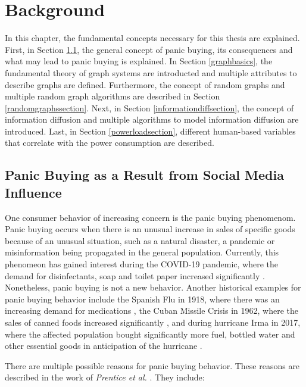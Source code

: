 \chapter{Background}
\label{background}

In this chapter, the fundamental concepts necessary for this thesis are explained.
First, in Section \ref{panicbuying}, the general concept of panic buying,
its consequences and what may lead to panic buying is explained.
In Section \ref{graphbasics}, the fundamental theory of graph systems are 
introducted and multiple attributes to describe graphs are defined.
Furthermore, the concept of random graphs and multiple random 
graph algorithms are described in Section \ref{randomgraphssection}.
Next, in Section \ref{informationdiffsection}, the concept of information diffusion
and multiple algorithms to model information diffusion are introduced.
Last, in Section \ref{powerloadsection}, different human-based variables that 
correlate with the power consumption are described.


\section{Panic Buying as a Result from Social Media Influence}
\label{panicbuying}

One consumer behavior of increasing concern is the panic buying phenomenom.
Panic buying occurs when there is an unusual increase in sales of specific
goods because of an unusual situation, such as a natural disaster, a 
pandemic or misinformation being propagated in the general population. 
Currently, this phenomeon has gained interest during the COVID-19 pandemic,
where the demand for disinfectants, soap and toilet paper increased significantly
\cite{covidpanicbuying}. Nonetheless, panic buying is not a new behavior.
Another historical examples for panic buying behavior include the Spanish Flu
in 1918, where there was an increasing demand for medications 
\cite{honigsbaum2013regulating}, the Cuban Missile Crisis in 1962, where the sales
of canned foods increased significantly \cite{george2004awaiting}, 
and during hurricane Irma in 2017, where the affected population bought
significantly more fuel, bottled water 
and other essential goods in anticipation of the hurricane \cite{irmahurricane}.

There are multiple possible reasons for panic buying behavior. These reasons 
are described in the work of \textit{Prentice et al.}
\cite{prentice2022antecedents}. They include:

